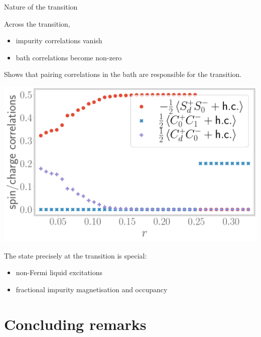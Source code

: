 \documentclass[10pt,aspectratio=169]{beamer}
\begin{document}
\begin{frame}{Nature of the transition}
\begin{minipage}{0.45\textwidth}
Across the transition,\\
\begin{itemize}
	\item impurity correlations vanish
	\item bath correlations become non-zero\\[10pt]
\end{itemize}

Shows that \alert{pairing correlations} in the bath are responsible for the transition.
\end{minipage}
\hspace*{\fill}
\begin{minipage}{0.5\textwidth}
\includegraphics[width=\textwidth]{spin-charge-corr-full.pdf}
\end{minipage}

\vspace*{\fill}
The state \alert{precisely at the transition} is special:
\begin{itemize}
	\item non-Fermi liquid excitations
	\item \alert{fractional} impurity magnetisation and occupancy
\end{itemize}
\end{frame}

\section{Concluding remarks}
\subsection{~}
\end{document}
